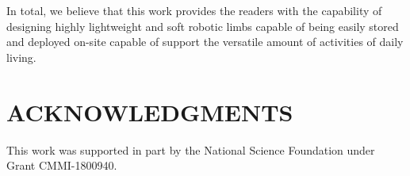 \documentclass[letterpaper, 10 pt, conference]{ieeeconf}  %
\begin{document}
In total, we believe that this work provides the readers with the capability of designing highly lightweight and soft robotic limbs capable of being easily stored and deployed on-site capable of support the versatile amount of activities of daily living.





\section*{ACKNOWLEDGMENTS} 
This work was supported in part by the National Science Foundation under Grant CMMI-1800940.







%
\end{document}
